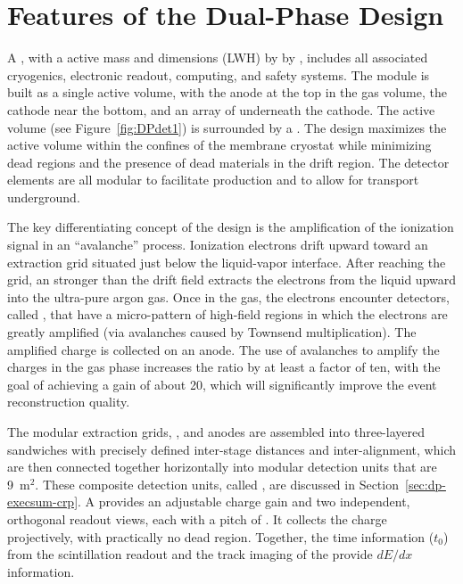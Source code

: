 \section{Features of the Dual-Phase Design}
\label{sec:dp-execsum-description}

A , with a  \dpactivelarmass{} active mass  and dimensions (LWH) \dptpclen by \dptpcwdth by \tpcheight{}, includes all associated cryogenics, electronic readout, computing, and safety systems. The module is built as a single active volume, with the anode at the top in the gas volume, the cathode near the bottom, and an array of  underneath the cathode. The active volume (see Figure~\ref{fig:DPdet1}) is surrounded by a . 
The  design maximizes the active volume within the confines of the membrane cryostat while minimizing dead regions and the presence of dead materials in the drift region.  The detector elements are all modular to facilitate production and to allow for transport underground.


The key differentiating concept of the  design is the amplification of the ionization signal in an ``avalanche'' process.  Ionization electrons drift upward toward an extraction grid situated just below the liquid-vapor interface. After reaching the grid, an \efield stronger than the drift field extracts the electrons from the liquid upward into the ultra-pure argon gas. 
Once in the gas, the electrons encounter detectors, called , that have a micro-pattern of high-field regions in which the electrons are greatly amplified (via avalanches caused by Townsend multiplication). 
The amplified charge is collected on an anode. The use of avalanches to amplify the charges in the gas phase increases the  ratio by at least
a factor of ten, with the goal of achieving a gain of about 20, which will significantly improve the
event reconstruction quality.

The modular extraction grids, , and anodes are assembled into three-layered sandwiches with precisely defined inter-stage distances and inter-alignment,  which are then connected together horizontally into modular detection units that are \num{9}~m$^2$. These composite detection units, called , are discussed in Section~\ref{sec:dp-execsum-crp}.
A  provides an adjustable charge gain and two independent, orthogonal readout views, each with a pitch of \dpstrippitch. It collects the charge projectively, with practically no dead region. Together, the time information  ($t_0$) from the  scintillation readout and the  \threed track imaging of the  provide $dE/dx$ information.  

